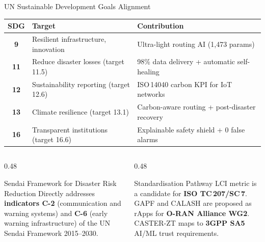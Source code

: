 \documentclass[aspectratio=169,t,10pt]{beamer}
\begin{document}
\begin{frame}{UN Sustainable Development Goals Alignment}
\centering\small
\renewcommand{\arraystretch}{1.3}
\begin{tabular}{cll}
  \toprule
  \textbf{SDG} & \textbf{Target} & \textbf{Contribution} \\
  \midrule
  \textbf{9}  & Resilient infrastructure, innovation       & Ultra-light routing AI (1,473 params) \\
  \textbf{11} & Reduce disaster losses (target 11.5)       & 98\% data delivery + automatic self-healing \\
  \textbf{12} & Sustainability reporting (target 12.6)     & ISO\,14040 carbon KPI for IoT networks \\
  \textbf{13} & Climate resilience (target 13.1)           & Carbon-aware routing + post-disaster recovery \\
  \textbf{16} & Transparent institutions (target 16.6)     & Explainable safety shield + 0 false alarms \\
  \bottomrule
\end{tabular}
\vspace{8pt}
\begin{columns}[T]
\begin{column}{0.48\textwidth}
  \begin{block}{Sendai Framework for Disaster Risk Reduction}
    \small Directly addresses \textbf{indicators C-2}
    (communication and warning systems) and \textbf{C-6}
    (early warning infrastructure) of the UN Sendai Framework 2015--2030.
  \end{block}
\end{column}
\begin{column}{0.48\textwidth}
  \begin{block}{Standardisation Pathway}
    \small LCI metric is a candidate for \textbf{ISO TC\,207/SC\,7}.
    GAPF and CALASH are proposed as rApps for
    \textbf{O-RAN Alliance WG2}.
    CASTER-ZT maps to \textbf{3GPP SA5} AI/ML trust requirements.
  \end{block}
\end{column}
\end{columns}
\end{frame}
\end{document}
